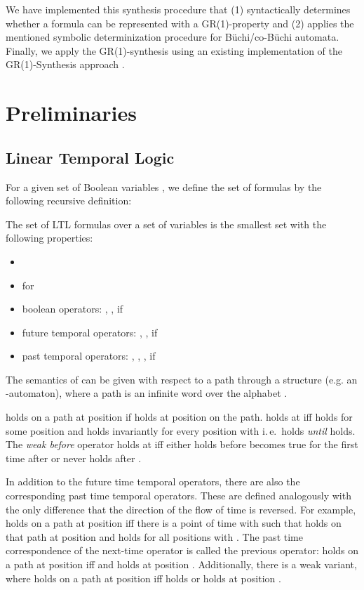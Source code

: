 \documentclass[submission,copyright,creativecommons]{eptcs}
\newcommand{\ie}{i.\,e.~}
\begin{document}
We have implemented this synthesis procedure that (1) syntactically determines whether a formula can be represented with a GR(1)-property and (2) applies the mentioned symbolic determinization procedure for Büchi/co-Büchi automata. Finally, we apply the GR(1)-synthesis using an existing implementation of the GR(1)-Synthesis approach \cite{BCGH10a}.

\section{Preliminaries}

\subsection{\texorpdfstring{Linear Temporal Logic \LTL{}}{Linear Temporal Logic LTL}}
For a given set of Boolean variables , we define the set of  formulas by the following recursive definition:
\begin{definition}
The set of  LTL formulas over a set of variables  is the smallest set with the following properties:
\begin{itemize} \setlength{\itemsep}{-1mm}
\item  
\item  for 
\item boolean operators: , ,  if 
\item future temporal operators: , ,   if 
\item past temporal operators: , , ,   if 	
\end{itemize}
\end{definition}

\noindent The semantics of \LTL{} can be given with respect to a path through a structure (e.g. an -automaton), where a path is an infinite word over the alphabet .

 holds on a path  at position  if  holds at position  on the path.  holds at  iff  holds for some position  and  holds invariantly for every position  with  \ie  holds \emph{until}  holds. The \emph{weak before} operator  holds at  iff either  holds before  becomes true for the first time after  or  never holds after . 

In addition to the future time temporal operators, there are also the corresponding past time temporal operators. These are defined analogously with the only difference that the direction of the flow of time is reversed. For example,  holds on a path at position  iff there is a point of time  with  such that  holds on that path at position  and  holds for all positions  with . The past time correspondence of the next-time operator is called the previous operator:  holds on a path at position  iff  and  holds at position . Additionally, there is a weak variant, where  holds on a path at position  iff  holds or  holds at position .   
\end{document}

